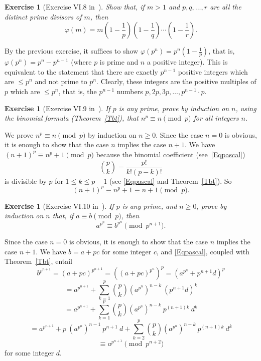 \documentclass[12pt,letterpaper]{article}
\newtheorem{exer}[thm]{Exercise}
\theoremstyle{definition}
\begin{document}
\begin{exer}[Exercise VI.8 in~\cite{weil1979}]
Show that, if $m>1$ and $p,q,\ldots,r$ are all the distinct prime divisors of $m$, then
\[
\varphi(m)=m\left(1-\frac{1}{p}\right)\left(1-\frac{1}{q}\right)\cdots\left(1-\frac{1}{r}\right).
\]
\end{exer}

By the previous exercise, it suffices to show $\varphi(p^n)=p^n(1-\frac{1}{p})$, that is, $\varphi(p^n)=p^n-p^{n-1}$ (where $p$ is prime and $n$ a positive integer). This is equivalent to the statement that there are exactly $p^{n-1}$ positive integers which are $\le p^n$ and not prime to $p^n$. Clearly, these integers are the positive multiples of $p$ which are $\le p^n$, that is, the $p^{n-1}$ numbers $p, 2p, 3p, \ldots, p^{n-1}\cdot p$. 

\begin{exer}[Exercise VI.9 in~\cite{weil1979}]
If $p$ is any prime, prove by induction on $n$, using the binomial formula (Theorem~\ref{Tbt}), that $n^p\equiv n\pmod p$ for all integers $n$.
\end{exer}

We prove $n^p\equiv n\pmod p$ by induction on $n \ge 0$. Since the case $n=0$ is obvious, it is enough to show that the case $n$ implies the case $n+1$. We have $(n+1)^p \equiv n^p + 1 \pmod p$ because the binomial coefficient (see~\eqref{Eqpascal})  
$$
\binom{p}{k}=\frac{p!}{k!(p-k)!}
$$ 
is divisible by $p$ for $1\le k\le p-1$ (see \eqref{Eqpascal} and Theorem~\ref{Tbt}). So 
$$
(n+1)^p \equiv n^p + 1 \equiv n+1 \pmod p.
$$ 

\begin{exer}[Exercise VI.10 in~\cite{weil1979}]\label{ExVI10} 
If $p$ is any prime, and $n\ge 0$, prove by induction on $n$ that, if $a\equiv b\pmod p$, then 
$$
a^{p^n}\equiv b^{p^n}\pmod{p^{n+1}}.
$$
\end{exer}

Since the case $n=0$ is obvious, it is enough to show that the case $n$ implies the case $n+1$. We have $b=a+pc$ for some integer $c$, and \eqref{Eqpascal}, coupled with Theorem~\ref{Tbt}, entail 
$$
b^{p^{n+1}} = (a+pc)^{p^{n+1}} = ((a+pc)^{p^n})^p = (a^{p^n} + p^{n+1} d)^p
$$ 
$$
=a^{p^{n+1}}+\sum_{k=1}^p \binom{p}{k} (a^{p^n})^{n-k}\ (p^{n+1} d)^k
$$ 
$$
=a^{p^{n+1}}+\sum_{k=1}^p \binom{p}{k} (a^{p^n})^{n-k}\ p^{(n+1)k}\ d^k
$$ 
$$
=a^{p^{n+1}}+p\ (a^{p^n})^{n-1}\ p^{n+1}\ d+\sum_{k=2}^p \binom{p}{k} (a^{p^n})^{n-k}\ p^{(n+1)k}\ d^k
$$ 
$$
\equiv a^{p^{n+1}} \pmod{p^{n+2}}
$$ 
for some integer $d$. 
\end{document}
